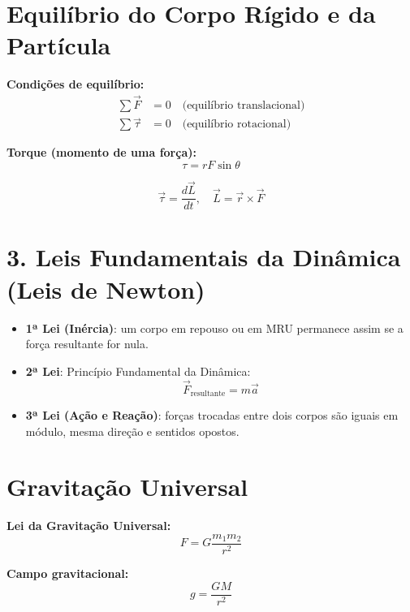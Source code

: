 \documentclass[a4paper,12pt]{article}
\begin{document}
\begin{multicols}{2}
\section{Equilíbrio do Corpo Rígido e da Partícula}

\textbf{Condições de equilíbrio:}
\begin{align*}
  \sum \vec{F} &= 0 \quad \text{(equilíbrio translacional)} \\
  \sum \vec{\tau} &= 0 \quad \text{(equilíbrio rotacional)}
\end{align*}

\textbf{Torque (momento de uma força):}
\begin{equation*}
  \tau = r F \sin \theta
\end{equation*}

\begin{equation*}
  \vec{\tau} = \frac{d\vec{L}}{dt}, \quad \vec{L} = \vec{r} \times \vec{F} 
\end{equation*}



\section{3. Leis Fundamentais da Dinâmica (Leis de Newton)}

\begin{itemize}
  \item \textbf{1ª Lei (Inércia)}: um corpo em repouso ou em MRU permanece assim se a força resultante for nula.
  \item \textbf{2ª Lei}: Princ\'ipio Fundamental da Din\^amica:
  \begin{equation*}
    \vec{F}_{\text{resultante}} = m \vec{a}
  \end{equation*}
  \item \textbf{3ª Lei (Ação e Reação)}: forças trocadas entre dois corpos são iguais em módulo, mesma direção e sentidos opostos.
\end{itemize}

\section{Gravitação Universal}

\textbf{Lei da Gravitação Universal:}
\begin{equation*}
  F = G \frac{m_1 m_2}{r^2}
\end{equation*}

\textbf{Campo gravitacional:}
\begin{equation*}
  g = \frac{G M}{r^2}
\end{equation*}


\end{multicols}
\end{document}
